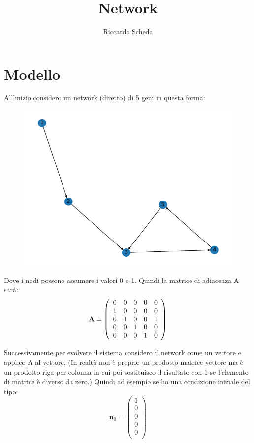 \documentclass[11pt]{article}
\title{Network}
\author{Riccardo Scheda}
\begin{document}
\maketitle

\section{Modello}
All'inizio considero un network (diretto) di 5 geni in questa forma:
\begin{figure}[ht!]
  \center
  \includegraphics[scale=0.5]{network.png}
  \label{fig:net}
\end{figure}
Dove i nodi possono assumere i valori 0 o 1.
Quindi la matrice di adiacenza A sarà:
$$
\bold{A} = \left (
\begin{array}{ccccc}

0 & 0 & 0 & 0 & 0  \\
1 & 0 & 0 & 0 & 0  \\
0 & 1 & 0 & 0 & 1  \\
0 & 0 & 1 & 0 & 0  \\
0 & 0 & 0 & 1 & 0  \\

\end{array}
\right )
$$

Successivamente per evolvere il sistema considero il network come un vettore e applico A al vettore, (In realtà non è proprio un prodotto matrice-vettore ma è un prodotto riga per colonna in cui poi sostituisco il risultato con 1 se l'elemento di matrice è diverso da zero.)
Quindi ad esempio se ho una condizione iniziale del tipo:
$$
\textbf{n}_0 = \left ( 
\begin{array}{c}
1 \\
0 \\
0 \\
0 \\
0 \\
\end{array}
\right ) 
$$
\end{document}
